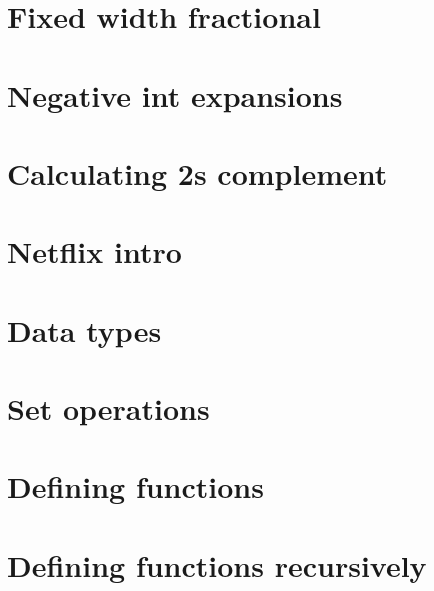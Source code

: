 \section*{Fixed width fractional}

\vfill
\section*{Negative int expansions}

\vfill
\section*{Calculating 2s complement}

\vfill
\section*{Netflix intro}

\vfill
\section*{Data types}

\vfill
\section*{Set operations}

\vfill
\section*{Defining functions}

\vfill
\section*{Defining functions recursively}

\vfill
